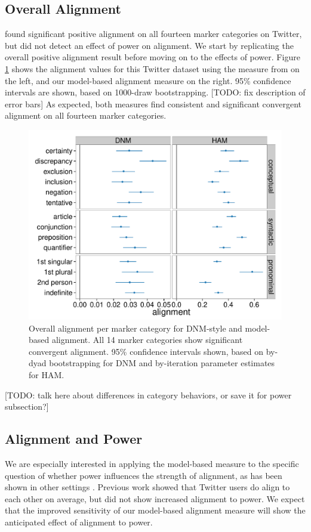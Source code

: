 \documentclass{acm_proc_article-sp}
\begin{document}
\subsection{Overall Alignment}
\cite{DNMGamonDumais2011} found significant positive alignment on all fourteen marker categories on Twitter, but did not detect an effect of power on alignment.  We start by replicating the overall positive alignment result before moving on to the effects of power.  Figure \ref{fig:overall-alignment} shows the alignment values for this Twitter dataset using the measure from \cite{DNMGamonDumais2011} on the left, and our model-based alignment measure on the right.  95\% confidence intervals are shown, based on 1000-draw bootstrapping. [TODO: fix description of error bars] As expected, both measures find consistent and significant convergent alignment on all fourteen marker categories.  

\begin{figure}[t]
\centering
\includegraphics[width=.9\columnwidth]{graphics/www2016_alignmentdnmour_final95.pdf}
\caption{Overall alignment per marker category for DNM-style and model-based alignment. All 14 marker categories show significant convergent alignment. 95\% confidence intervals shown, based on by-dyad bootstrapping for DNM and by-iteration parameter estimates for HAM.}\label{fig:overall-alignment}
\end{figure}

[TODO: talk here about differences in category behaviors, or save it for power subsection?]

\subsection{Alignment and Power}
We are especially interested in applying the model-based measure to the specific question of whether power influences the strength of alignment, as has been shown in other settings \cite{DNMEtAl2012,NobleFernandez2015}. Previous work \cite{DNMGamonDumais2011} showed that Twitter users do align to each other on average, but did not show increased alignment to power.  We expect that the improved sensitivity of our model-based alignment measure will show the anticipated effect of alignment to power.
\end{document}

